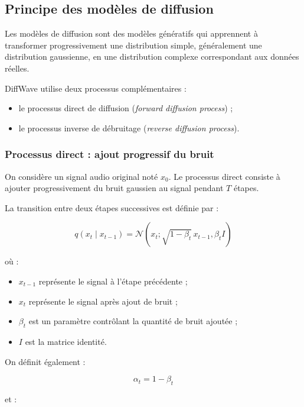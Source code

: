 \subsection{Principe des modèles de diffusion}

Les modèles de diffusion sont des modèles génératifs qui apprennent
à transformer progressivement une distribution simple, généralement
une distribution gaussienne, en une distribution complexe correspondant
aux données réelles.

DiffWave utilise deux processus complémentaires :
\begin{itemize}
    \item le processus direct de diffusion
    (\textit{forward diffusion process}) ;
    \item le processus inverse de débruitage
    (\textit{reverse diffusion process}).
\end{itemize}

\subsubsection{Processus direct : ajout progressif du bruit}

On considère un signal audio original noté $x_0$.
Le processus direct consiste à ajouter progressivement du bruit
gaussien au signal pendant $T$ étapes.

La transition entre deux étapes successives est définie par :

\begin{equation}
q(x_t \mid x_{t-1}) =
\mathcal{N}
\left(
x_t ;
\sqrt{1-\beta_t}\,x_{t-1},
\beta_t I
\right)
\end{equation}

où :
\begin{itemize}
    \item $x_{t-1}$ représente le signal à l'étape précédente ;
    \item $x_t$ représente le signal après ajout de bruit ;
    \item $\beta_t$ est un paramètre contrôlant la quantité
    de bruit ajoutée ;
    \item $I$ est la matrice identité.
\end{itemize}

On définit également :

\begin{equation}
\alpha_t = 1-\beta_t
\end{equation}

et :

